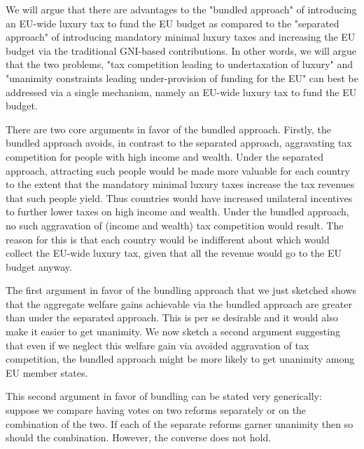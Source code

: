 \documentclass{article}
\begin{document}
We will argue that there are advantages to the "bundled approach" of introducing an EU-wide luxury tax to fund the EU budget as compared to the "separated approach" of introducing mandatory minimal luxury taxes and increasing the EU budget via the traditional GNI-based contributions. In other words, we will argue that the two problems, "tax competition leading to undertaxation of luxury" and "unanimity constraints leading under-provision of funding for the EU" can best be addressed via a single mechanism, namely an EU-wide luxury tax to fund the EU budget. 

There are two core arguments in favor of the bundled approach. Firstly, the bundled approach avoids, in contrast to the separated approach, aggravating tax competition for people with high income and wealth. Under the separated approach, attracting such people would be made more valuable for each country to the extent that the mandatory minimal luxury taxes increase the tax revenues that such people yield. Thus countries would have increased unilateral incentives to further lower taxes on high income and wealth. Under the bundled approach, no such aggravation of (income and wealth) tax competition would result. The reason for this is that each country would be indifferent about which would collect the EU-wide luxury tax, given that all the revenue would go to the EU budget anyway.

The first argument in favor of the bundling approach that we just sketched shows that the aggregate welfare gains achievable via the bundled approach are greater than under the separated approach. This is per se desirable and it would also make it easier to get unanimity. We now sketch a second argument suggesting that even if we neglect this welfare gain via avoided aggravation of tax competition, the bundled approach might be more likely to get unanimity among EU member states.

This second argument in favor of bundling can be stated very generically: suppose we compare having votes on two reforms separately or on the combination of the two. %
If each of the separate reforms garner unanimity then so should the combination. However, the converse does not hold.
\end{document}
